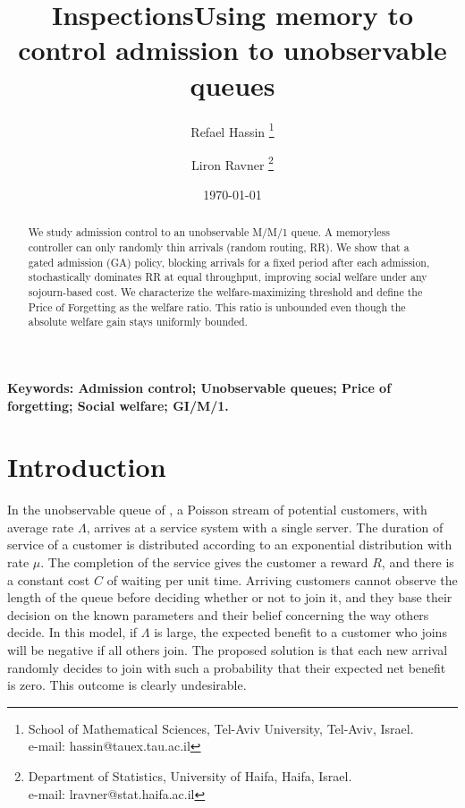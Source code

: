 \documentclass[11pt]{article}
\title{Inspections}
\date{\today}
\begin{document}
\title{Using memory to control admission to unobservable queues}
\author{Refael Hassin  \footnote{School of Mathematical Sciences, Tel-Aviv University, Tel-Aviv, Israel.\\ e-mail: hassin@tauex.tau.ac.il}
   \and  Liron Ravner \footnote{Department of Statistics,  University of Haifa, Haifa, Israel.\\ e-mail: lravner@stat.haifa.ac.il} }

\maketitle

\begin{abstract}
We study admission control to an unobservable M/M/1 queue. A memoryless controller can only randomly thin arrivals (random routing, RR). We show that a gated admission (GA) policy,  blocking arrivals for a fixed period after each admission, stochastically dominates RR at equal throughput, improving social welfare under any sojourn-based cost. We characterize the welfare-maximizing threshold and define the Price of Forgetting as the welfare ratio. This ratio is unbounded even though the absolute welfare gain stays uniformly bounded.
\end{abstract}
 \vspace{1cm}
\noindent\textbf{Keywords: Admission control; Unobservable queues; Price of forgetting; Social welfare; GI/M/1.}

\section{Introduction}

In the unobservable queue of \citet{EH75}, a Poisson stream of potential customers, with average rate $\Lambda$, arrives at a service system with a single server. The duration of service of a customer is distributed according to an exponential distribution with rate $\mu$. The completion of the service gives the customer a reward $R$, and there is a constant cost $C$ of waiting per unit time.  Arriving customers cannot observe the length of the queue before deciding whether or not to join it, and they base their decision on the known parameters and their belief concerning the way others decide.   In this model, if $\Lambda$ is large, the expected benefit to a customer who joins will be negative if all others join.  The proposed solution is that each new arrival randomly decides to join with such a probability that their expected net benefit is zero. This outcome is clearly undesirable.  
\end{document}
